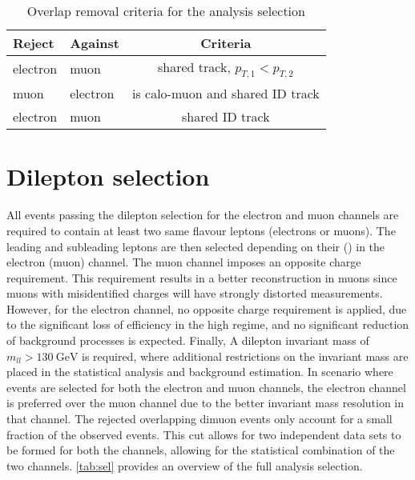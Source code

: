 \begin{table}[]
   \centering
   {
   \begin{tabular}{l|l||c}
 \hline
     Reject & Against & Criteria \\
     \hline
     electron & muon & shared track, $p_{T,1} < p_{T,2}$ \\
     muon & electron & is calo-muon and shared ID track \\
     electron & muon & shared ID track \\
 \hline
   \end{tabular}
   }
   \caption[Overlap removal criteria for the analysis selection]{Overlap removal criteria for the analysis selection}
   \label{tab:sel:overlap}
 \end{table}

\section{Dilepton selection}
All events passing the dilepton selection for the electron and muon channels are required to contain at least two same flavour leptons (electrons or muons). The leading and subleading leptons are then selected depending on their \et (\pt) in the electron (muon) channel. The muon channel imposes an opposite charge requirement. This requirement results in a better \pt reconstruction in muons since muons with misidentified charges will have strongly distorted \pt measurements. However, for the electron channel, no opposite charge requirement is applied, due to the significant loss of efficiency in the high \et regime, and no significant reduction of background processes is expected. Finally, A dilepton invariant mass of $m_{ll} > \SI{130}{\giga\electronvolt}$ is required, where additional restrictions on the invariant mass are placed in the statistical analysis and background estimation. In scenario where events are selected for both the electron and muon channels, the electron channel is preferred over the muon channel due to the better invariant mass resolution in that channel. The rejected overlapping dimuon events only account for a small fraction of the observed events. This cut allows for two independent data sets to be formed for both the channels, allowing for the statistical combination of the two channels. \cref{tab:sel} provides an overview of the full analysis selection. 

